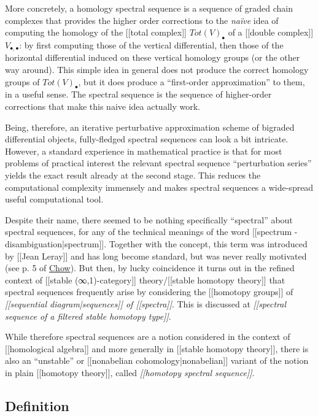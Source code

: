 \documentclass[12pt,titlepage]{article}
\theoremstyle{plain}
\theoremstyle{definition}
\theoremstyle{remark}
\begin{document}
More concretely, a homology spectral sequence is a sequence of graded chain complexes that provides the higher order corrections to the \emph{na\"i{}ve} idea of computing the homology of the [[total complex]] $Tot(V)_\bullet$ of a [[double complex]] $V_{\bullet, \bullet}$: by first computing those of the vertical differential, then those of the horizontal differential induced on these vertical homology groups (or the other way around). This simple idea in general does not produce the correct homology groups of $Tot(V)_\bullet$, but it does produce a ``first-order approximation'' to them, in a useful sense. The spectral sequence is the sequence of higher-order corrections that make this naive idea actually work.

Being, therefore, an iterative perturbative approximation scheme of bigraded differential objects, fully-fledged spectral sequences can look a bit intricate. However, a standard experience in mathematical practice is that for most problems of practical interest the relevant spectral sequence ``perturbation series'' yields the exact result already at the second stage. This reduces the computational complexity immensely and makes spectral sequences a wide-spread useful computational tool.

Despite their name, there seemed to be nothing specifically ``spectral'' about spectral sequences, for any of the technical meanings of the word [[spectrum - disambiguation|spectrum]]. Together with the concept, this term was introduced by [[Jean Leray]] and has long become standard, but was never really motivated (see p. 5 of \hyperlink{Chow}{Chow}). But then, by lucky coincidence it turns out in the refined context of [[stable (∞,1)-category]] theory/[[stable homotopy theory]] that spectral sequences frequently arise by considering the [[homotopy groups]] of \emph{[[sequential diagram|sequences]] of [[spectra]]}. This is discussed at \emph{[[spectral sequence of a filtered stable homotopy type]]}.

While therefore spectral sequences are a notion considered in the context of [[homological algebra]] and more generally in [[stable homotopy theory]], there is also an ``unstable'' or [[nonabelian cohomology|nonabelian]] variant of the notion in plain [[homotopy theory]], called \emph{[[homotopy spectral sequence]]}.

\hypertarget{definition}{}\subsection*{{Definition}}\label{definition}
\end{document}
